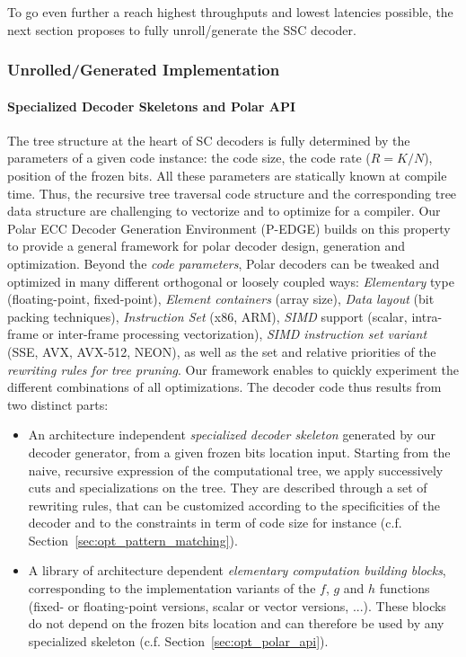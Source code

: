To go even further a reach highest throughputs and lowest latencies possible,
the next section proposes to fully unroll/generate the SSC decoder.

\subsubsection{Unrolled/Generated Implementation}

\paragraph{Specialized Decoder Skeletons and Polar API}

The tree structure at the heart of SC decoders is fully determined by the
parameters of a given code instance: the code size, the code rate ($R = K / N$),
position of the frozen bits. All these parameters are  statically known at
compile time. Thus, the recursive tree traversal code structure and the
corresponding tree data structure are challenging to vectorize and to optimize
for a compiler. Our Polar ECC Decoder Generation Environment (P-EDGE) builds on
this property to provide a general framework for polar decoder design,
generation and optimization. Beyond the \emph{code parameters}, Polar decoders
can be tweaked and optimized in many different orthogonal or loosely coupled
ways: \emph{Elementary} type (floating-point, fixed-point),
\emph{Element containers} (array size), \emph{Data layout} (bit packing
techniques), \emph{Instruction Set} (x86, ARM\R), \emph{SIMD} support (scalar,
intra-frame or inter-frame processing vectorization), \emph{SIMD instruction set
variant} (SSE, AVX, AVX-512, NEON), as well as the set and relative priorities
of the \emph{rewriting rules for tree pruning}. Our framework enables to quickly
experiment the different combinations of all optimizations. The decoder code
thus results from two distinct parts:
\begin{itemize}
  \item An architecture independent \emph{specialized decoder skeleton}
    generated by our decoder generator, from a given frozen bits location input.
    Starting from the naive, recursive expression of the computational tree, we
    apply successively cuts and specializations on the tree. They are described
    through a set of rewriting rules, that can be customized according to the
    specificities of the decoder and to the constraints in term of code size for
    instance (c.f. Section~\ref{sec:opt_pattern_matching}).
  \item A library of architecture dependent \emph{elementary computation
    building blocks}, corresponding to the implementation variants of the $f$,
    $g$ and $h$ functions (fixed- or floating-point versions, scalar or vector
    versions, ...). These blocks do not depend on the frozen bits location and
    can therefore be used by any specialized skeleton (c.f.
    Section~\ref{sec:opt_polar_api}).
\end{itemize}

